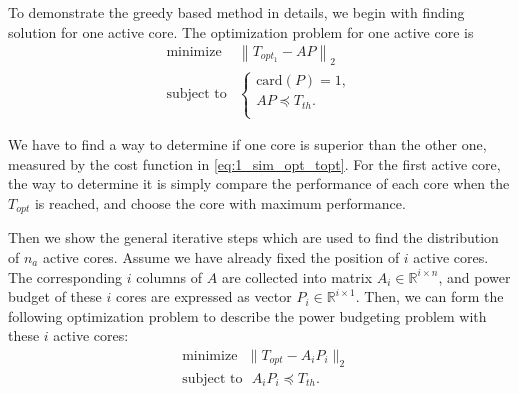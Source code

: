 To demonstrate the greedy based method in details, we begin with finding solution for one active core. The optimization problem for one active core is
\begin{equation}\label{eq:1_sim_opt_topt}
\begin{split}
\text{minimize } &  \left \| T_{opt_1} - AP \right \|_{2}\\
\text{subject to} &\left\{
\begin{array}{lr}
\text{card}(P) = 1,\\
AP \preceq T_{th}.\\
\end{array}
\right.
\end{split}
\end{equation}


We have to find a way to determine if one core is superior than the other one, measured by the cost function in \eqref{eq:1_sim_opt_topt}. For the first active core, the way to determine it is simply compare the performance of each core when the $T_{opt}$ is reached, and choose the core with maximum performance.

Then we show the general iterative steps which are used to find the distribution of $n_{a}$ active cores. Assume we have already fixed the position of $i$ active cores. The corresponding $i$ columns of $A$ are collected into
matrix $A_i \in \mathbb{R}^{i \times n}$, and power budget of these $i$
cores are expressed as vector $P_i \in \mathbb{R}^{i \times 1}$. Then,
we can form the following optimization problem to describe the power
budgeting problem with these $i$ active cores:
\begin{equation}\label{eq:temp_ss_i_pb}
  \begin{split}
    &\text{minimize~~} \|T_{opt}-A_i P_i\|_2\\
    &\text{subject to~~} A_i P_i\preceq T_{th}.
  \end{split}
\end{equation}

